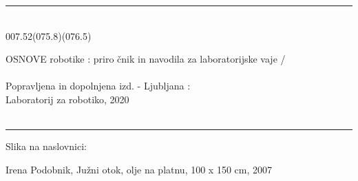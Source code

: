 \documentclass{kapmono}
\theoremstyle{definition}
\theoremstyle{plain}
\begin{document}


\thispagestyle{empty}
\parindent0cm
\normalsize {
\rule{12cm}{0.5pt} \\ %
%

\vskip13pt %
007.52(075.8)(076.5)

\hskip0.7cm   OSNOVE robotike : priro \v cnik in navodila za
laboratorijske vaje /\\
\\ Popravljena in dopolnjena izd. - Ljubljana : \\
Laboratorij za robotiko, 2020   %
\\ \\



\vskip5pt %
\rule{12cm}{0.5pt}
\vskip10pt %
Slika na naslovnici:

\hskip0.7cm Irena Podobnik, Ju\v zni otok, olje na platnu, 100 x 150
cm, 2007

\vskip0.5in

%
%

\vskip0.5in




\vskip10pt


}
\end{document}
